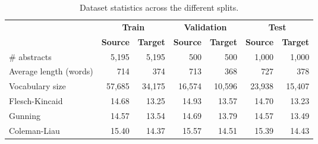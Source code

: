 \documentclass[letterpaper, table]{article} %
\begin{document}
\begin{table*}
\centering
\begin{tabular}{@{} l rr rr rr @{}}
\toprule
& \multicolumn{2}{c}{\bf Train} & \multicolumn{2}{c}{\bf Validation} & \multicolumn{2}{c}{\bf Test} \\ 
\cmidrule(lr){2-3}
\cmidrule(lr){4-5}
\cmidrule(lr){6-7}
\multicolumn{1}{c}{}                           & \textbf{Source}       & \textbf{Target}      
& \textbf{Source}       & \textbf{Target}          
& \textbf{Source}       & \textbf{Target}      \\ 
\midrule
\# abstracts                              & 5,195        & 5,195       & 500            & 500            & 1,000       & 1,000       \\
Average length (words)                      & 714          & 374         & 713            & 368            & 727         & 378         \\
Vocabulary size                                  & 57,685       & 34,175       & 16,574         & 10,596         & 23,938      & 15,407      \\ \midrule
Flesch-Kincaid & 14.68 & 13.25 & 14.93 & 13.57 & 14.70 & 13.23\\
Gunning & 14.57 & 13.54 & 14.69 & 13.79 & 14.57 & 13.49\\
Coleman-Liau & 15.40 & 14.37 & 15.57 & 14.51 & 15.39 & 14.43 \\
\bottomrule

\end{tabular}
\caption{Dataset statistics across the different splits.}
\label{data_description}

\end{table*}

\end{document}

